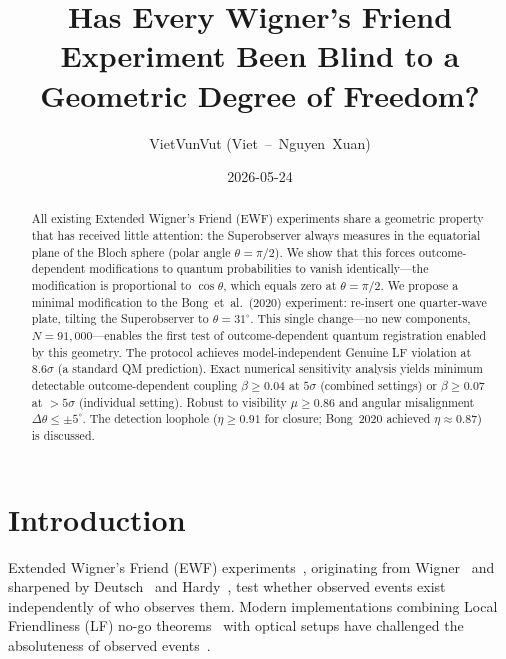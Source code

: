 \documentclass[twocolumn,aps,pra,superscriptaddress,floatfix,10pt]{revtex4-2}
\begin{document}
\title{Has Every Wigner's Friend Experiment Been Blind to a Geometric Degree of Freedom?}

\author{VietVunVut (Viet~--~Nguyen~Xuan)}

\date{2026-05-24}

\begin{abstract}
All existing Extended Wigner's Friend (EWF) experiments share a geometric
property that has received little attention: the Superobserver always
measures in the equatorial plane of the Bloch sphere (polar angle
$\theta = \pi/2$). We show that this forces outcome-dependent modifications
to quantum probabilities to vanish identically---the modification is
proportional to $\cos\theta$, which equals zero at $\theta = \pi/2$.
We propose a minimal modification to the Bong~et~al.~(2020) experiment:
re-insert one quarter-wave plate, tilting the Superobserver to
$\theta = 31^\circ$. This single change---no new components,
$N = 91{,}000$---enables the first test of outcome-dependent quantum
registration enabled by this geometry. The protocol achieves
model-independent Genuine LF violation at $8.6\sigma$ (a standard QM
prediction). Exact numerical sensitivity analysis yields minimum
detectable outcome-dependent coupling $\beta \ge 0.04$ at $5\sigma$
(combined settings) or $\beta \ge 0.07$ at $>5\sigma$ (individual
setting). Robust to visibility $\mu \ge 0.86$ and angular misalignment
$\Delta\theta \le \pm5^\circ$. The detection loophole ($\eta \ge 0.91$
for closure; Bong~2020 achieved $\eta \approx 0.87$) is discussed.
\end{abstract}

\maketitle

\section{Introduction}
\label{sec:intro}

Extended Wigner's Friend (EWF) experiments~\cite{Proietti2019,Bong2020},
originating from Wigner~\cite{Wigner1961} and sharpened by
Deutsch~\cite{Deutsch1985} and Hardy~\cite{Hardy1992}, test whether
observed events exist independently of who observes them. Modern
implementations combining Local Friendliness (LF) no-go
theorems~\cite{Bong2020,Wiseman2023,Haddara2024a} with optical setups
have challenged the absoluteness of observed events~\cite{Haddara2023b,
Kent2023}.
\end{document}
